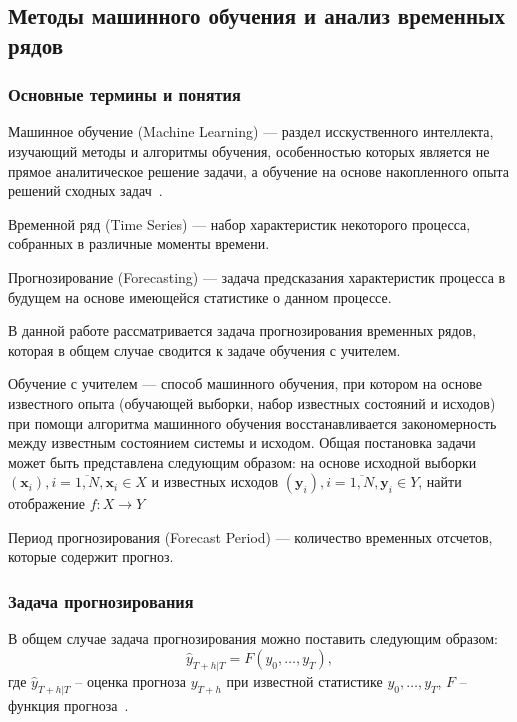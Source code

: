 \subsection{Методы машинного обучения и анализ временных рядов}
\subsubsection{Основные термины и понятия}

Машинное обучение (Machine Learning) --- раздел исскуственного интеллекта, изучающий методы и алгоритмы обучения,
особенностью которых является не прямое аналитическое решение задачи, а обучение на основе накопленного опыта решений
сходных задач~\autocite{ml:definition}.

Временной ряд (Time Series) --- набор характеристик некоторого процесса, собранных в различные моменты времени.

Прогнозирование (Forecasting) --- задача предсказания характеристик процесса в будущем на основе имеющейся статистике
о данном процессе.

В данной работе рассматривается задача прогнозирования временных рядов, которая в общем случае сводится к задаче
обучения с учителем.

Обучение с учителем --- способ машинного обучения, при котором на основе известного опыта (обучающей выборки, набор
известных состояний и исходов) при помощи алгоритма машинного обучения восстанавливается закономерность между известным
состоянием системы и исходом. Общая постановка задачи может быть представлена следующим образом: на основе исходной
выборки $\left( \mathbf{x}_i \right), i = \overline{1, N}, \mathbf{x}_i \in X$ и известных исходов
$\left( \mathbf{y}_i \right), i = \overline{1, N}, \mathbf{y}_i \in Y$, найти отображение $f: X \rightarrow Y$

Период прогнозирования (Forecast Period) --- количество временных отсчетов, которые содержит прогноз.

\subsubsection{Задача прогнозирования}
В общем случае задача прогнозирования можно поставить следующим образом:
\begin{equation}
    \hat{y}_{\left.T+h\right|T} = F\left(y_0, \dots, y_T\right),
\end{equation}
где  $\hat{y}_{\left.T+h\right|T}$ -- оценка прогноза $y_{T+h}$ при известной статистике $y_0, \dots, y_T$,
$F$ -- функция прогноза~\autocite{ml:forecasting}.

